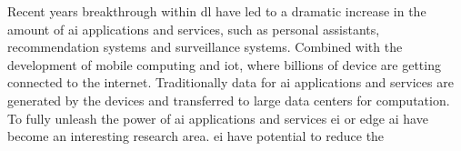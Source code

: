 \hypertarget{inroduction}{%
\label{sec:introduction}}
\thispagestyle{fancy}

Recent years breakthrough within \gls{dl} have led to a dramatic increase in the amount of \gls{ai} applications and services, such as personal assistants, recommendation systems and surveillance systems. Combined with the development of mobile computing and \gls{iot}, where billions of device are getting connected to the internet. Traditionally data for \gls{ai} applications and services are generated by the devices and transferred to large data centers for computation.    To fully unleash the power of \gls{ai} applications and services \gls{ei} or edge \gls{ai} have become an interesting research area. \gls{ei} have potential to reduce the 